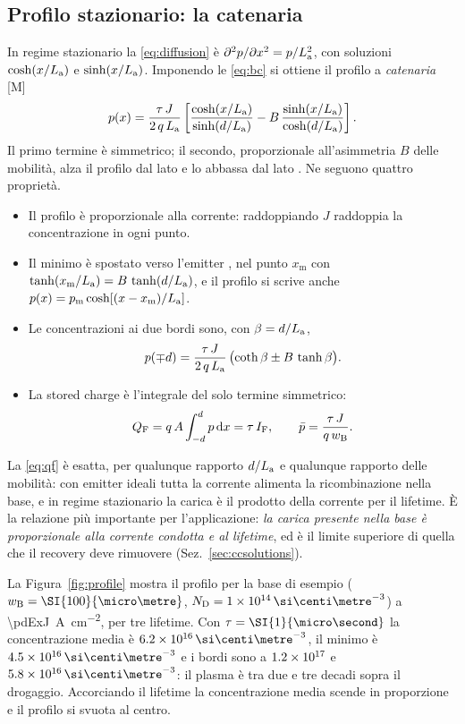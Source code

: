 \documentclass[10pt,a4paper]{scrartcl}
\let\newcommand\pdvaluedefine
\newcommand{\IF}{I_\mathrm{F}}
\newcommand{\diff}{\mathrm{d}}
\newcommand{\ND}{N_\mathrm{D}}
\newcommand{\wB}{w_\mathrm{B}}
\newcommand{\La}{L_\mathrm{a}}
\newcommand{\QF}{Q_\mathrm{F}}
\newcommand{\Pp}{p\textsuperscript{+}}
\newcommand{\Np}{n\textsuperscript{+}}
\newcommand{\cmc}{\si{\centi\metre^{-3}}}
\begin{document}
\subsection{Profilo stazionario: la catenaria}
\label{sec:catenary}
In regime stazionario la \eqref{eq:diffusion} è $\partial^2 p/\partial x^2 = p/\La^2$, con soluzioni $\cosh(x/\La)$ e $\sinh(x/\La)$. Imponendo le \eqref{eq:bc} si ottiene il profilo a \emph{catenaria} [M]~\cite{hall1952,baliga}
\begin{equation}
p(x) = \frac{\tau\,J}{2\,q\,\La}\left[\frac{\cosh(x/\La)}{\sinh(d/\La)} - B\,\frac{\sinh(x/\La)}{\cosh(d/\La)}\right] .
\label{eq:catenary}
\end{equation}
Il primo termine è simmetrico; il secondo, proporzionale all'asimmetria $B$ delle mobilità, alza il profilo dal lato \Pp{} e lo abbassa dal lato \Np. Ne seguono quattro proprietà.
\begin{itemize}
\item Il profilo è proporzionale alla corrente: raddoppiando $J$ raddoppia la concentrazione in ogni punto.
\item Il minimo è spostato verso l'emitter \Np, nel punto $x_\mathrm{m}$ con $\tanh(x_\mathrm{m}/\La) = B\,\tanh(d/\La)$, e il profilo si scrive anche $p(x) = p_\mathrm{m}\cosh[(x - x_\mathrm{m})/\La]$.
\item Le concentrazioni ai due bordi sono, con $\beta = d/\La$,
\begin{equation}
p(\mp d) = \frac{\tau\,J}{2\,q\,\La}\,\bigl(\coth\beta \pm B\,\tanh\beta\bigr) .
\label{eq:edges}
\end{equation}
\item La stored charge è l'integrale del solo termine simmetrico:
\begin{equation}
\QF = q\,A\int_{-d}^{d} p\,\diff x = \tau\,\IF , \qquad \bar p = \frac{\tau\,J}{q\,\wB} .
\label{eq:qf}
\end{equation}
\end{itemize}
La \eqref{eq:qf} è esatta, per qualunque rapporto $d/\La$ e qualunque rapporto delle mobilità: con emitter ideali tutta la corrente alimenta la ricombinazione nella base, e in regime stazionario la carica è il prodotto della corrente per il lifetime. È la relazione più importante per l'applicazione: \emph{la carica presente nella base è proporzionale alla corrente condotta e al lifetime}, ed è il limite superiore di quella che il recovery deve rimuovere (Sez.~\ref{sec:ccsolutions}).

La Figura~\ref{fig:profile} mostra il profilo per la base di esempio ($\wB = \SI{\pdExW}{\micro\metre}$, $\ND = \pdExNd\,\cmc$) a \SI{\pdExJ}{\ampere\per\centi\metre\squared}, per tre lifetime. Con $\tau = \SI{\pdExMidTau}{\micro\second}$ la concentrazione media è $\pdExMidPbar\,\cmc$, il minimo è $\pdExMidPmin\,\cmc$ e i bordi sono a $1.2\times10^{17}$ e $\pdExMidPr\,\cmc$: il plasma è tra due e tre decadi sopra il drogaggio. Accorciando il lifetime la concentrazione media scende in proporzione e il profilo si svuota al centro.
\end{document}
